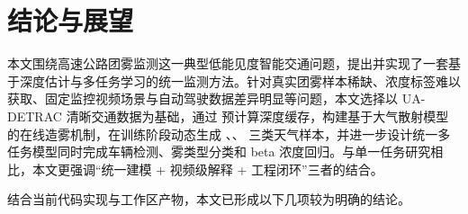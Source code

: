 \chapter{结论与展望}

本文围绕高速公路团雾监测这一典型低能见度智能交通问题，提出并实现了一套基于深度估计与多任务学习的统一监测方法。针对真实团雾样本稀缺、浓度标签难以获取、固定监控视频场景与自动驾驶数据差异明显等问题，本文选择以 UA-DETRAC 清晰交通数据为基础，通过  预计算深度缓存，构建基于大气散射模型的在线造雾机制，在训练阶段动态生成 、、 三类天气样本，并进一步设计统一多任务模型同时完成车辆检测、雾类型分类和 beta 浓度回归。与单一任务研究相比，本文更强调“统一建模 + 视频级解释 + 工程闭环”三者的结合\cite{uadetrac,midas,koschmieder,caruana1997multitask}。

结合当前代码实现与工作区产物，本文已形成以下几项较为明确的结论。

